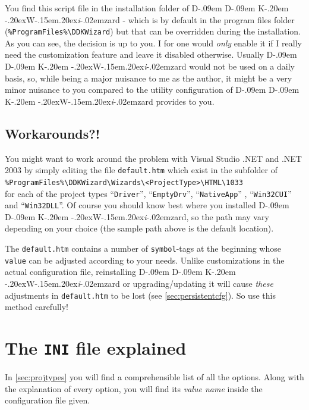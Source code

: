 \documentclass[a4paper,titlepage]{report}
\def\ddkwiz{D\kern-.09em D\kern-.09em K\kern-.20em \raise-.20ex\hbox{W}\kern-.15em\raise.20ex\hbox{\it{i}}\kern-.02em{zard}}
\begin{document}
You find this script file in the installation folder of \ddkwiz{} - which is by
default in the program files folder
(\verb+%ProgramFiles%\DDKWizard+) but that can be overridden during the installation.\\

As you can see, the decision is up to you. I for one would \emph{only} enable it if
I really need the customization feature and leave it disabled otherwise. Usually
\ddkwiz{} would not be used on a daily basis, so, while being a major nuisance
to me as the author, it might be a very minor nuisance to you compared to the utility
configuration of \ddkwiz{} provides to you.

\subsection{Workarounds?!}
You might want to work around the problem with Visual Studio .NET and .NET 2003
by simply editing the file \texttt{default.htm} which exist in the subfolder of\\
\verb+%ProgramFiles%\DDKWizard\Wizards\<ProjectType>\HTML\1033+\\
for each of the
project types ``\texttt{Driver}'', ``\texttt{EmptyDrv}'', ``\texttt{NativeApp}''
, ``\texttt{Win32CUI}'' and ``\texttt{Win32DLL}''. Of course you should know best where you installed
\ddkwiz{}, so the path may vary depending on your choice (the sample path above
is the default location).

The \texttt{default.htm} contains a number of \texttt{symbol}-tags at the beginning
whose \texttt{value} can be adjusted according to your needs. Unlike customizations
in the actual configuration file, reinstalling \ddkwiz{} or
upgrading/updating it will cause \emph{these} adjustments in \texttt{default.htm}
to be lost (see \autoref{sec:persistentcfg}). So use this method carefully!

\section{The \texttt{INI} file explained}
In \autoref{sec:projtypes} you will find a comprehensible list of all the options.
Along with the explanation of every option, you will find its \emph{value name} inside the
configuration file given.
\end{document}
